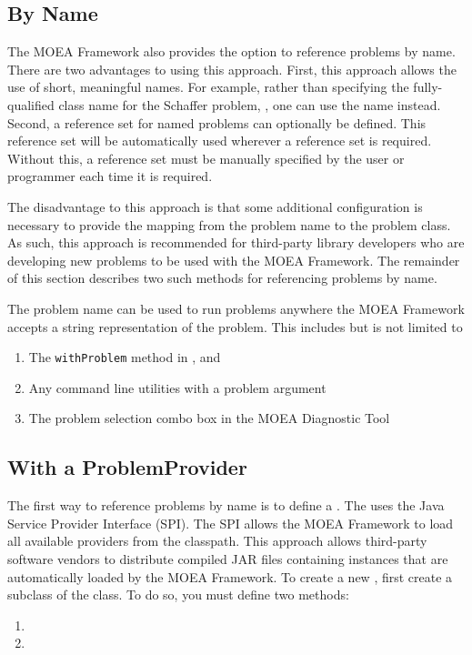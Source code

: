 \subsection{By Name}

The MOEA Framework also provides the option to reference problems by name.  There are two advantages to using this approach.  First, this approach allows the use of short, meaningful names.  For example, rather than specifying the fully-qualified class name for the Schaffer problem, , one can use the name  instead.  Second, a reference set for named problems can optionally be defined.  This reference set will be automatically used wherever a reference set is required.  Without this, a reference set must be manually specified by the user or programmer each time it is required.

The disadvantage to this approach is that some additional configuration is necessary to provide the mapping from the problem name to the problem class.  As such, this approach is recommended for third-party library developers who are developing new problems to be used with the MOEA Framework.  The remainder of this section describes two such methods for referencing problems by name.

The problem name can be used to run problems anywhere the MOEA Framework accepts a string representation of the problem.  This includes but is not limited to
\begin{enumerate}
  \item The \texttt{withProblem} method in ,  and 
  \item Any command line utilities with a problem argument
  \item The problem selection combo box in the MOEA Diagnostic Tool
\end{enumerate}

\subsection{With a ProblemProvider}
The first way to reference problems by name is to define a .  The  uses the Java Service Provider Interface (SPI).  The SPI allows the MOEA Framework to load all available providers from the classpath.  This approach allows third-party software vendors to distribute compiled JAR files containing  instances that are automatically loaded by the MOEA Framework.  To create a new , first create a subclass of the  class.  To do so, you must define two methods:
\begin{enumerate}
  \item {}
  \item {}
\end{enumerate}

